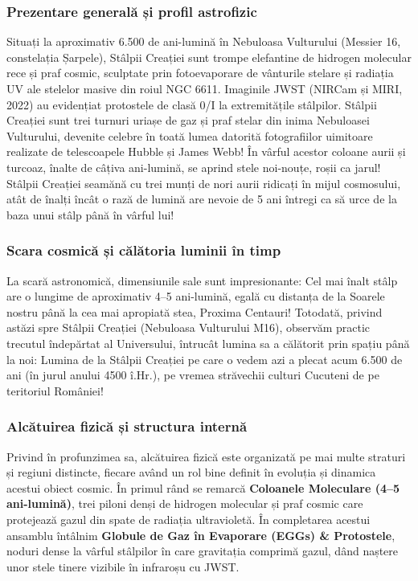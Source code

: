 \subsubsection*{Prezentare generală și profil astrofizic}
Situați la aproximativ 6.500 de ani-lumină în Nebuloasa Vulturului (Messier 16, constelația Șarpele), Stâlpii Creației sunt trompe elefantine de hidrogen molecular rece și praf cosmic, sculptate prin fotoevaporare de vânturile stelare și radiația UV ale stelelor masive din roiul NGC 6611. Imaginile JWST (NIRCam și MIRI, 2022) au evidențiat protostele de clasă 0/I la extremitățile stâlpilor. Stâlpii Creației sunt trei turnuri uriașe de gaz și praf stelar din inima Nebuloasei Vulturului, devenite celebre în toată lumea datorită fotografiilor uimitoare realizate de telescoapele Hubble și James Webb! În vârful acestor coloane aurii și turcoaz, înalte de câțiva ani-lumină, se aprind stele noi-nouțe, roșii ca jarul! Stâlpii Creației seamănă cu trei munți de nori aurii ridicați în mijul cosmosului, atât de înalți încât o rază de lumină are nevoie de 5 ani întregi ca să urce de la baza unui stâlp până în vârful lui!

\subsubsection*{Scara cosmică și călătoria luminii în timp}
La scară astronomică, dimensiunile sale sunt impresionante: Cel mai înalt stâlp are o lungime de aproximativ 4--5 ani-lumină, egală cu distanța de la Soarele nostru până la cea mai apropiată stea, Proxima Centauri! Totodată, privind astăzi spre Stâlpii Creației (Nebuloasa Vulturului M16), observăm practic trecutul îndepărtat al Universului, întrucât lumina sa a călătorit prin spațiu până la noi: Lumina de la Stâlpii Creației pe care o vedem azi a plecat acum 6.500 de ani (în jurul anului 4500 î.Hr.), pe vremea străvechii culturi Cucuteni de pe teritoriul României!

\subsubsection*{Alcătuirea fizică și structura internă}
Privind în profunzimea sa, alcătuirea fizică este organizată pe mai multe straturi și regiuni distincte, fiecare având un rol bine definit în evoluția și dinamica acestui obiect cosmic. În primul rând se remarcă \textbf{Coloanele Moleculare (4--5 ani-lumină)}, trei piloni denși de hidrogen molecular și praf cosmic care protejează gazul din spate de radiația ultravioletă. În completarea acestui ansamblu întâlnim \textbf{Globule de Gaz în Evaporare (EGGs) \& Protostele}, noduri dense la vârful stâlpilor în care gravitația comprimă gazul, dând naștere unor stele tinere vizibile în infraroșu cu JWST.

